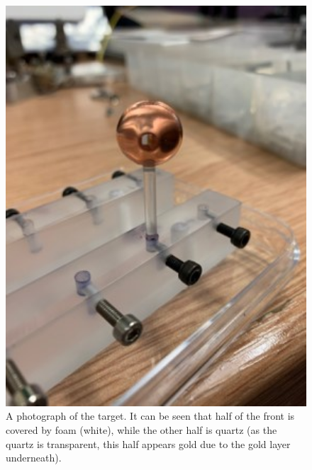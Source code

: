 \begin{figure}
\begin{centering}
\includegraphics[width=1.0\textwidth]{figures/AppendixExperiment/Target.jpg}%
\caption{\label{fig:Appx-Target} A photograph of the target. It can be seen that half of the front is covered by foam (white), while the other half is quartz (as the quartz is transparent, this half appears gold due to the gold layer underneath).}
\end{centering}
\end{figure}

